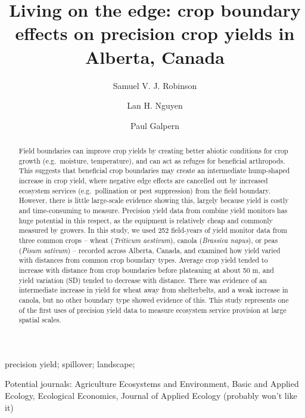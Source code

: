 \documentclass[]{elsarticle} %
\begin{document}
\begin{frontmatter}

  \title{Living on the edge: crop boundary effects on precision crop yields in Alberta, Canada}
    \author[University of Calgary]{Samuel V. J. Robinson}
    \author[University of Calgary]{Lan H. Nguyen}
    \author[University of Calgary]{Paul Galpern}
      \address[University of Calgary]{2500 University Drive NW, Calgary, AB}
  
  \begin{abstract}
  Field boundaries can improve crop yields by creating better abiotic conditions for crop growth (e.g.~moisture, temperature), and can act as refuges for beneficial arthropods. This suggests that beneficial crop boundaries may create an intermediate hump-shaped increase in crop yield, where negative edge effects are cancelled out by increased ecosystem services (e.g.~pollination or pest suppression) from the field boundary. However, there is little large-scale evidence showing this, largely because yield is costly and time-consuming to measure. Precision yield data from combine yield monitors has huge potential in this respect, as the equipment is relatively cheap and commonly measured by growers. In this study, we used 252 field-years of yield monitor data from three common crops -- wheat (\emph{Triticum aestivum}), canola (\emph{Brassica napus}), or peas (\emph{Pisum sativum}) -- recorded across Alberta, Canada, and examined how yield varied with distances from common crop boundary types. Average crop yield tended to increase with distance from crop boundaries before plateauing at about 50 m, and yield variation (SD) tended to decrease with distance. There was evidence of an intermediate increase in yield for wheat away from shelterbelts, and a weak increase in canola, but no other boundary type showed evidence of this. This study represents one of the first uses of precision yield data to measure ecosystem service provision at large spatial scales.
  \end{abstract}
   \begin{keyword} precision yield; spillover; landscape;\end{keyword}
 \end{frontmatter}

Potential journals: Agriculture Ecosystems and Environment, Basic and Applied Ecology, Ecological Economics, Journal of Applied Ecology (probably won't like it)
\end{document}
